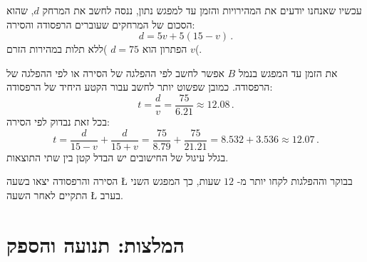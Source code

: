 עכשיו שאנחנו יודעים את המהירויות והזמן עד למפגש נתון, ננסה לחשב את המרחק 
$d$,
שהוא הסכום של המרחקים שעוברים הרפסודה והסירה:
\[
d = 5v + 5(15-v)\,.
\]
הפתרון הוא
$d=75$
)ללא תלות במהירות הזרם
$v$(.

\smallskip

את הזמן עד המפגש בנמל 
$B$
אפשר לחשב לפי ההפלגה של הסירה או לפי ההפלגה של הרפסודה. כמובן שפשוט יותר לחשב עבור הקטע היחיד של הרפסודה:
\[
t = \frac{d}{v} = \frac{75}{6.21} \approx 12.08\,.
\]
בכל זאת נבדוק לפי הסירה:
\[
t = \frac{d}{15-v} + \frac{d}{15+v} = \frac{75}{8.79} + \frac{75}{21.21}= 8.532 + 3.536 \approx 12.07\,.
\]
בגלל עיגול של החישובים יש הבדל קטן בין שתי התוצאות.

הסירה והרפסודה יצאו בשעה
\L{}
בבוקר וההפלגות לקחו יותר מ-%
$12$
שעות, כך המפגש השני התקיים לאחר השעה
\L{}
בערב.



\np

\section{המלצות: תנועה והספק}


